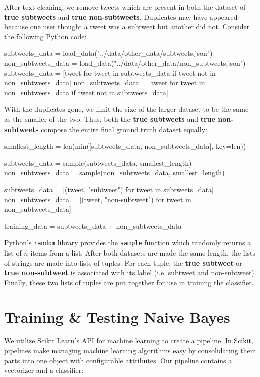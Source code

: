 \documentclass[11pt, twoside, reqno]{book}
\begin{document}
After text cleaning, we remove tweets which are present in both the dataset of \textbf{true subtweets} and \textbf{true non-subtweets}. Duplicates may have appeared because one user thought a tweet was a subtweet but another did not. Consider the following Python code:

\pagebreak
\begin{python}
	subtweets_data = load_data("../data/other_data/subtweets.json")
	non_subtweets_data = load_data("../data/other_data/non_subtweets.json")
	subtweets_data = [tweet for tweet in subtweets_data 
                    if tweet not in non_subtweets_data]
	non_subtweets_data = [tweet for tweet in non_subtweets_data 
                        if tweet not in subtweets_data]
\end{python}

\noindent
With the duplicates gone, we limit the size of the larger dataset to be the same as the smaller of the two. Thus, both the \textbf{true subtweets} and \textbf{true non-subtweets} compose the entire final ground truth dataset equally:

\begin{python}
	smallest_length = len(min([subtweets_data, non_subtweets_data], key=len))
	
	subtweets_data = sample(subtweets_data, smallest_length)
	non_subtweets_data = sample(non_subtweets_data, smallest_length)
	
	subtweets_data = [(tweet, "subtweet") for tweet in subtweets_data]
	non_subtweets_data = [(tweet, "non-subtweet") for tweet in non_subtweets_data]
	
	training_data = subtweets_data + non_subtweets_data
\end{python}

\noindent
Python's \verb|random| library provides the \verb|sample| function which randomly returns a list of $n$ items from a list. After both datasets are made the same length, the lists of strings are made into lists of tuples. For each tuple, the \textbf{true subtweet} or \textbf{true non-subtweet} is associated with its label (i.e. subtweet and non-subtweet). Finally, these two lists of tuples are put together for use in training the classifier.

\section{Training \& Testing Naive Bayes}
\label{training_and_testing_naive_bayes}

We utilize Scikit Learn's API for machine learning \cite{scikit} to create a pipeline. In Scikit, pipelines make managing machine learning algorithms easy by consolidating their parts into one object with configurable attributes. Our pipeline contains a vectorizer and a classifier:
\end{document}
